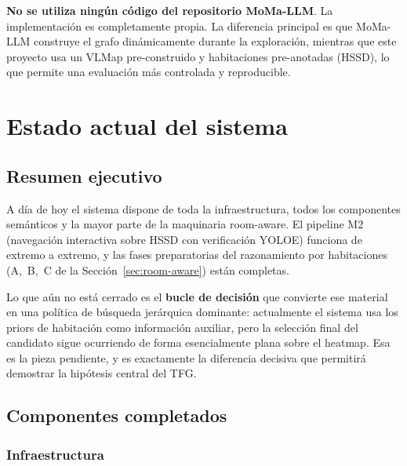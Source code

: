 \documentclass[11pt,a4paper]{article}
\begin{document}
\textbf{No se utiliza ningún código del repositorio MoMa-LLM}. La implementación
es completamente propia. La diferencia principal es que MoMa-LLM construye el
grafo dinámicamente durante la exploración, mientras que este proyecto usa un
VLMap pre-construido y habitaciones pre-anotadas (HSSD), lo que permite una
evaluación más controlada y reproducible.

\section{Estado actual del sistema}

\subsection{Resumen ejecutivo}

A día de hoy el sistema dispone de toda la infraestructura, todos los
componentes semánticos y la mayor parte de la maquinaria room-aware. El
pipeline M2 (navegación interactiva sobre HSSD con verificación YOLOE)
funciona de extremo a extremo, y las fases preparatorias del razonamiento por
habitaciones (A,~B,~C de la Sección~\ref{sec:room-aware}) están completas.

Lo que aún no está cerrado es el \textbf{bucle de decisión} que convierte ese
material en una política de búsqueda jerárquica dominante: actualmente el
sistema usa los priors de habitación como información auxiliar, pero la
selección final del candidato sigue ocurriendo de forma esencialmente plana
sobre el heatmap. Esa es la pieza pendiente, y es exactamente la diferencia
decisiva que permitirá demostrar la hipótesis central del TFG.

\subsection{Componentes completados}

\subsubsection*{Infraestructura}
\end{document}

